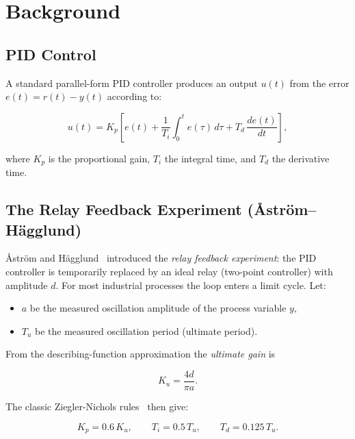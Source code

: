 \documentclass[12pt,a4paper]{article}
\begin{document}
\section{Background}
\label{sec:background}

\subsection{PID Control}

A standard parallel-form PID controller produces an output $u(t)$ from the error
$e(t) = r(t) - y(t)$ according to:

\begin{equation}
  u(t) = K_p \left[ e(t) + \frac{1}{T_i}\int_0^t e(\tau)\,d\tau + T_d\,\frac{de(t)}{dt} \right],
  \label{eq:pid}
\end{equation}

where $K_p$ is the proportional gain, $T_i$ the integral time, and $T_d$ the
derivative time.

\subsection{The Relay Feedback Experiment (Åström–Hägglund)}

\AA{}str\"om and H\"agglund~\cite{astrom1984} introduced the \emph{relay feedback
experiment}: the PID controller is temporarily replaced by an ideal relay (two-point
controller) with amplitude $d$. For most industrial processes the loop enters a
limit cycle. Let:

\begin{itemize}
  \item $a$ be the measured oscillation amplitude of the process variable $y$,
  \item $T_u$ be the measured oscillation period (ultimate period).
\end{itemize}

From the describing-function approximation the \emph{ultimate gain} is

\begin{equation}
  K_u = \frac{4d}{\pi a}.
  \label{eq:ku}
\end{equation}

The classic Ziegler-Nichols rules~\cite{ziegler1942} then give:

\begin{equation}
  K_p = 0.6\,K_u, \qquad T_i = 0.5\,T_u, \qquad T_d = 0.125\,T_u.
  \label{eq:zn}
\end{equation}
\end{document}
